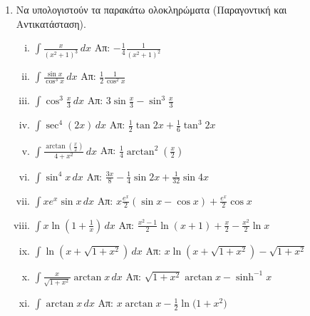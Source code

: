 


\everymath{\displaystyle}
\thispagestyle{askhseis}



\begin{center}
\minibox{\large\bfseries \textcolor{Col1}{Ολοκληρώματα}}
\end{center}

\vspace{\baselineskip}

\begin{enumerate}
	\item Να υπολογιστούν τα παρακάτω ολοκληρώματα (Παραγοντική και
		Αντικατάσταση).

		\begin{enumerate}[i)]
			\item $ \int \frac{x}{(x^{2} + 1)^{3}}  \,{dx} $  \hfill Απ: $ -
				\frac{1}{4} \frac{1}{(x^{2}+1)^{2}} $
			\item $ \int \frac{\sin{x}}{\cos^{3}{x}} \,{dx} $  \hfill Απ: $
				\frac{1}{2} \frac{1}{\cos^{2}{x}} $
			\item $ \int \cos^{3}{\frac{x}{3}} \,{dx} $ \hfill Απ: $ 3
				\sin{\frac{x}{3}} - \sin^{3}{\frac{x}{3}} $
			\item $ \int \sec^{4}(2x) \,{dx}$  \hfill Απ: $ \frac{1}{2} \tan{2x} +
				\frac{1}{6} \tan^{3}{2x}  $\
			\item $ \int \frac{\arctan(\frac{x}{2})}{4+x^{2}} \,{dx} $  
        \hfill Απ: $ \frac{1}{4}
				\arctan^{2}\left(\frac{x}{2}\right) $
			\item $ \int \sin^{4}x \,{dx} $  \hfill Απ: $ \frac{3x}{8} -
				\frac{1}{4} \sin{2x} + \frac{1}{32} \sin{4x} $
			\item $ \int xe^{x} \sin{x}\,{dx}  $  \hfill Απ: $ x \frac{e^{x}}{2}
        (\sin{x} - \cos{x}) + \frac{e^{x}}{2} \cos{x} $
			\item $ \int x \ln(1 + \frac{1}{x}) \,{dx} $ \hfill Απ: $ \frac{x^{2} - 1}{2}
				\ln{(x+1)} + \frac{x}{2} - \frac{x^{2}}{2} \ln{x} $
			\item $ \int \ln{(x + \sqrt{1+x^{2}})} \,{dx} $ \hfill Απ: $ x \ln{(x +
				\sqrt{1 + x^{2}})} - \sqrt{1 + x^{2}}  $
			\item $ \int \frac{x}{\sqrt{1 + x^{2}}} \arctan x \,{dx} $ \hfill Απ: $
				\sqrt{1 + x^{2}} \arctan x - \sinh^{-1}{x}  $
			\item $ \int \arctan x \,{dx} $ \hfill Απ: $ x \arctan x - \frac{1}{2}
				\ln{(1 + x^{2}})  $
		\end{enumerate}



\end{enumerate}
